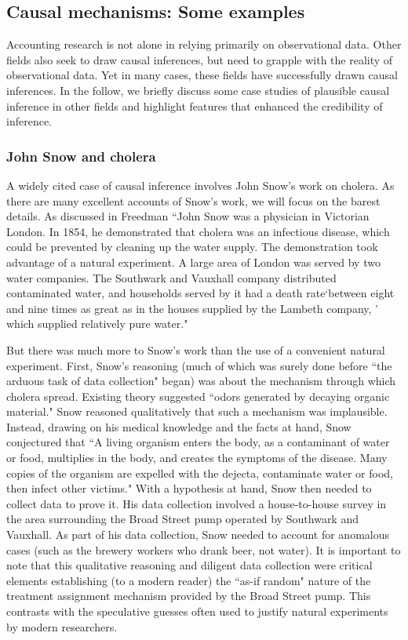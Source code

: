 \documentclass[11pt]{amsart}
\begin{document}
\subsection{Causal mechanisms: Some examples}

Accounting research is not alone in relying primarily on observational data.
Other fields also seek to draw causal inferences, but need to grapple with the reality of observational data. 
Yet in many cases, these fields have successfully drawn causal inferences.
In the follow, we briefly discuss some case studies of plausible causal inference in other fields and highlight features that enhanced the credibility of inference.

\subsubsection{John Snow and cholera}
A widely cited case of causal inference involves John Snow's work on cholera.
As there are many excellent accounts of Snow's work, we will focus on the barest details.
As discussed in Freedman %
``John Snow was a physician in Victorian London.
 In 1854, he demonstrated that cholera was an infectious disease, which could be prevented by cleaning up the water supply. 
The demonstration took advantage of a natural experiment.
 A large area of London was served by two water companies. 
 The Southwark and Vauxhall company distributed contaminated water, and households served by it had a death rate`between eight and nine times as great as in the houses supplied by the Lambeth company, ' which supplied relatively pure water."

But there was much more to Snow's work than the use of a convenient natural experiment.
First, Snow's reasoning (much of which was surely done before ``the arduous task of data collection" began) was about the  mechanism through which cholera spread. Existing theory suggested ``odors generated by decaying organic material."
Snow reasoned qualitatively that such a mechanism was implausible.
Instead, drawing on his medical knowledge and the facts at hand, Snow conjectured that ``A living organism enters the body, as a contaminant of water or food, multiplies in the body, and creates the symptoms of the disease. Many copies of the organism are expelled with the dejecta, contaminate water or food, then infect other victims."
With a hypothesis at hand, Snow then needed to collect data to prove it.
His data collection involved a house-to-house survey in the area surrounding the Broad Street pump operated by  Southwark and Vauxhall.
As part of his data collection, Snow needed to account for anomalous cases (such as the brewery workers who drank beer, not water).
It is important to note that this qualitative reasoning and diligent data collection were critical elements establishing (to a modern reader) the ``as-if random" nature of the treatment assignment mechanism provided by the Broad Street pump.
This contrasts with the speculative guesses often used to justify natural experiments by modern researchers.
\end{document}
